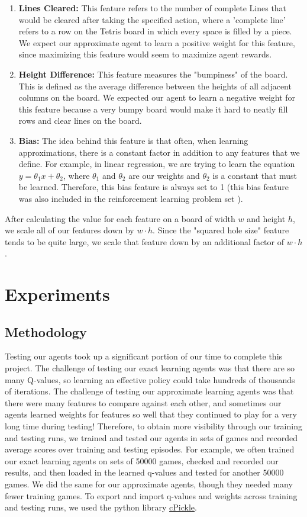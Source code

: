 \documentclass[10pt]{article}
\begin{document}
\begin{enumerate}
    \item \textbf{Lines Cleared:}
    This feature refers to the number of complete Lines that would be cleared after taking the specified action, where a 'complete line' refers to a row on the Tetris board in which every space is filled by a piece. We expect our approximate agent to learn a positive weight for this feature, since maximizing this feature would seem to maximize agent rewards.
    \item \textbf{Height Difference:}
    This feature measures the "bumpiness" of the board. This is defined as the average difference between the heights of all adjacent columns on the board. We expected our agent to learn a negative weight for this feature because a very bumpy board would make it hard to neatly fill rows and clear lines on the board.
    \item \textbf{Bias:}
    The idea behind this feature is that often, when learning approximations, there is a constant factor in addition to any features that we define. For example, in linear regression, we are trying to learn the equation $y = \theta_1x + \theta_2$, where $\theta_1$ and $\theta_2$ are our weights and $\theta_2$ is a constant that must be learned. Therefore, this bias feature is always set to 1 (this bias feature was also included in the reinforcement learning problem set \cite{CODE:1}).
\end{enumerate}
After calculating the value for each feature on a board of width $w$ and height $h$, we scale all of our features down by $w\cdot h$. Since the "squared hole size" feature tends to be quite large, we scale that feature down by an additional factor of $w \cdot h$.

\section{Experiments}

\subsection{Methodology}
Testing our agents took up a significant portion of our time to complete this project. The challenge of testing our exact learning agents was that there are so many Q-values, so learning an effective policy could take hundreds of thousands of iterations. The challenge of testing our approximate learning agents was that there were many features to compare against each other, and sometimes our agents learned weights for features so well that they continued to play for a very long time during testing! Therefore, to obtain more visibility through our training and testing runs, we trained and tested our agents in sets of games and recorded average scores over training and testing episodes. For example, we often trained our exact learning agents on sets of 50000 games, checked and recorded our results, and then loaded in the learned q-values and tested for another 50000 games. We did the same for our approximate agents, though they needed many fewer training games. To export and import q-values and weights across training and testing runs, we used the python library \href{https://docs.python.org/2/library/pickle.html#module-cPickle}{cPickle}.
\end{document}
